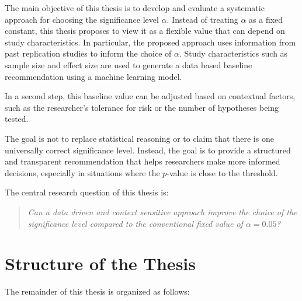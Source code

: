 The main objective of this thesis is to develop and evaluate a systematic approach for choosing the significance level $\alpha$. Instead of treating $\alpha$ as a fixed constant, this thesis proposes to view it as a flexible value that can depend on study characteristics. In particular, the proposed approach uses information from past replication studies to inform the choice of $\alpha$. Study characteristics such as sample size and effect size are used to generate a data based baseline recommendation using a machine learning model.

In a second step, this baseline value can be adjusted based on contextual factors, such as the researcher’s tolerance for risk or the number of hypotheses being tested.

The goal is not to replace statistical reasoning or to claim that there is one universally correct significance level. Instead, the goal is to provide a structured and transparent recommendation that helps researchers make more informed decisions, especially in situations where the $p$-value is close to the threshold.

The central research question of this thesis is:

\begin{quote}
	\textit{Can a data driven and context sensitive approach 
		improve the choice of the significance level compared to 
		the conventional fixed value of $\alpha = 0.05$?}
\end{quote}


\section{Structure of the Thesis}

The remainder of this thesis is organized as follows:

